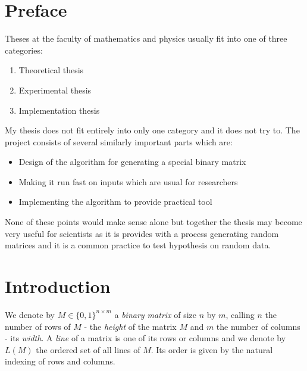\chapter*{Preface}
Theses at the faculty of mathematics and physics usually fit into one of three categories:
\begin{enumerate}
\item Theoretical thesis
\item Experimental thesis
\item Implementation thesis
\end{enumerate}
My thesis does not fit entirely into only one category and it does not try to. The project consists of several similarly important parts which are:
\begin{itemize}
\item Design of the algorithm for generating a special binary matrix
\item Making it run fast on inputs which are usual for researchers
\item Implementing the algorithm to provide practical tool
\end{itemize}
None of these points would make sense alone but together the thesis may become very useful for scientists as it is provides with a process generating random matrices and it is a common practice to test hypothesis on random data.
\chapter*{Introduction}
We denote by $M\in\{0,1\}^{n\times m}$ a \emph{binary matrix} of size $n$ by $m$, calling $n$ the number of rows of $M$ - the \emph{height} of the matrix $M$ and $m$ the number of columns - its \emph{width}. A \emph{line} of a matrix is one of its rows or columns and we denote by $L(M)$ the ordered set of all lines of $M$. Its order is given by the natural indexing of rows and columns.

